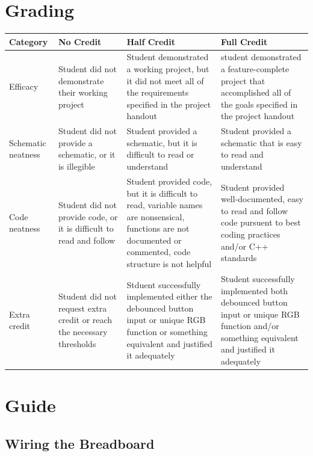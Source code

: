 \documentclass{article}
\begin{document}
\section*{Grading}
\begin{tabular}{ | p{1in} | p{1.75in} | p{1.75in} | p{1.75in} | }
    \hline
    \textbf{Category} & \textbf{No Credit} & \textbf{Half Credit} & \textbf{Full Credit} \\

    \hline
    Efficacy & 
    Student did not demonstrate their working project & 
    Student demonstrated a working project, but it did not meet all of the requirements specified in the project handout & 
    student demonstrated a feature-complete project that accomplished all of the goals specified in the project handout \\
    \hline
    Schematic neatness & 
    Student did not provide a schematic, or it is illegible &
    Student provided a schematic, but it is difficult to read or understand &
    Student provided a schematic that is easy to read and understand \\
    \hline
    Code neatness &
    Student did not provide code, or it is difficult to read and follow &
    Student provided code, but it is difficult to read, variable names are nonsensical, functions are not documented or commented, code structure is not helpful &
    Student provided well-documented, easy to read and follow code pursuent to best coding practices and/or C++ standards \\
    \hline
    Extra credit &
    Student did not request extra credit or reach the necessary thresholds & 
    Stduent successfully implemented either the debounced button input or unique RGB function or something equivalent and justified it adequately &
    Student successfully implemented both debounced button input or unique RGB function and/or something equivalent and justified it adequately \\

    \hline
\end{tabular}

\section*{Guide}

    \subsection*{Wiring the Breadboard}
\end{document}
